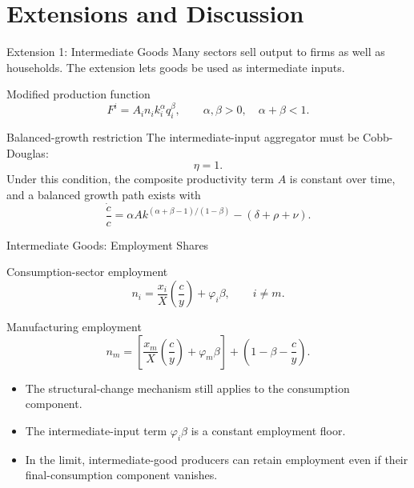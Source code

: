 \section{Extensions and Discussion}

\begin{frame}{Extension 1: Intermediate Goods}
  \small
  Many sectors sell output to firms as well as households. The extension lets
  goods be used as intermediate inputs.

  \vspace{0.10cm}
  \begin{block}{Modified production function}
    \begin{equation*}
      F^i=A_i n_i k_i^\alpha q_i^\beta,\qquad
      \alpha,\beta>0,\quad \alpha+\beta<1 .
    \end{equation*}
  \end{block}

  \begin{alertblock}{Balanced-growth restriction}
    The intermediate-input aggregator must be Cobb-Douglas:
    \[
      \eta=1.
    \]
    Under this condition, the composite productivity term $A$ is constant over
    time, and a balanced growth path exists with
    \[
      \frac{\dot c}{c}
      =
      \alpha A k^{(\alpha+\beta-1)/(1-\beta)}
      -(\delta+\rho+\nu).
    \]
  \end{alertblock}
\end{frame}

\begin{frame}{Intermediate Goods: Employment Shares}
  \small
  \begin{block}{Consumption-sector employment}
    \begin{equation*}
      n_i=\frac{x_i}{X}\left(\frac{c}{y}\right)+\varphi_i\beta,
      \qquad i\neq m .
    \end{equation*}
  \end{block}

  \begin{alertblock}{Manufacturing employment}
    \begin{equation*}
      n_m=
      \left[
      \frac{x_m}{X}\left(\frac{c}{y}\right)+\varphi_m\beta
      \right]
      +\left(1-\beta-\frac{c}{y}\right).
    \end{equation*}
  \end{alertblock}

  \vspace{0.10cm}
  \begin{itemize}
    \item The structural-change mechanism still applies to the consumption component.
    \item The intermediate-input term $\varphi_i\beta$ is a constant employment floor.
    \item In the limit, intermediate-good producers can retain employment even if
      their final-consumption component vanishes.
  \end{itemize}
\end{frame}


